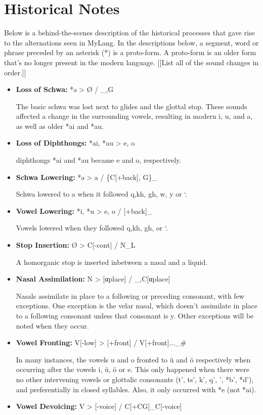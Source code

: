 \documentclass[oneside]{book}
\newcommand{\LanguageName}{MyLang}
\begin{document}
\section{Historical Notes}

Below is a behind-the-scenes description of the historical processes that gave rise to the alternations seen in \LanguageName.
In the descriptions below, a segment, word or phrase preceded by an asterisk (*) is a proto-form.
A proto-form is an older form that's no longer present in the modern language.
[[List all of the sound changes in order.]]

\begin{itemize}
\item
\textbf{Loss of Schwa:}
*ǝ > Ø / \_,G

The basic schwa was lost next to glides and the glottal stop.
These sounds affected a change in the surrounding vowels, resulting in modern i, u, and a, as well as older *ai and *au.
\item
\textbf{Loss of Diphthongs:}
*ai, *au > e, o

diphthongs *ai and *au became e and o, respectively.
\item
\textbf{Schwa Lowering:}
*ǝ > a / \{C[+back], G\}\_

Schwa lowered to a when it followed q,kh, gh, w, y or ‘.
\item
\textbf{Vowel Lowering:}
*i, *u > e, o / [+back]\_

Vowels lowered when they followed q,kh, gh, or ‘.
\item
\textbf{Stop Insertion:}
Ø > C[-cont] / N\_L

A homorganic stop is inserted inbetween a nasal and a liquid.
\item
\textbf{Nasal Assimilation:}
N > [αplace] / \_,C[αplace]

Nasals assimilate in place to a following or preceding consonant, with few exceptions.
One exception is the velar nasal, which doesn't assimilate in place to a following consonant unless that consonant is y.
Other exceptions will be noted when they occur.
\item
\textbf{Vowel Fronting:}
V[-low] > [+front] / V[+front]...\_\#

In many instances, the vowels u and o fronted to ü and ö respectively when occurring after the vowels i, ü, ö or e.
This only happened when there were no other intervening vowels or glottalic consonants (t', ts', k', q', ', *b', *d'), and preferentially in closed syllables.
Also, it only occurred with *e (not *ai).
\item
\textbf{Vowel Devoicing:}
V > [-voice] / C[+CG]\_C[-voice]


\end{itemize}
\end{document}
